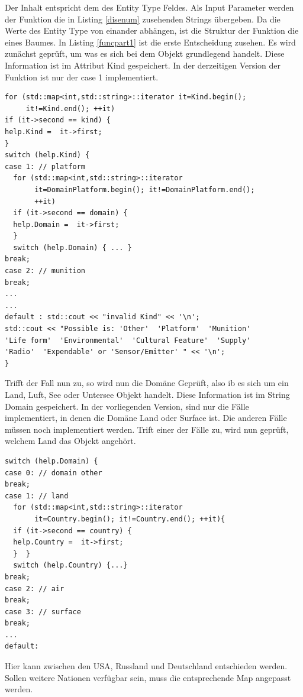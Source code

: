 Der Inhalt entspricht dem  des \glqq Entity Type\grqq{} Feldes. Als Input Parameter werden der Funktion die in Listing  \ref{disenum} zusehenden Strings übergeben. Da die Werte des \glqq Entity Type\grqq{}  von einander abhängen, ist die Struktur der Funktion die eines Baumes.  In Listing \ref{funcpart1} ist die erste Entscheidung zusehen. Es wird zunächst geprüft, um was es sich bei dem Objekt grundlegend handelt. Diese Information ist im Attribut \glqq Kind \grqq{} gespeichert. In der derzeitigen Version der Funktion ist nur der \glqq case 1\grqq{} implementiert. 
 \begin{lstlisting}[caption = Funktion \glqq getDISEntityType()\grqq{} Teil 1  ,label= funcpart1]
for (std::map<int,std::string>::iterator it=Kind.begin(); 
     it!=Kind.end(); ++it)
if (it->second == kind) {
help.Kind =  it->first;
}
switch (help.Kind) {
case 1: // platform
  for (std::map<int,std::string>::iterator 
       it=DomainPlatform.begin(); it!=DomainPlatform.end();
       ++it)
  if (it->second == domain) {
  help.Domain =  it->first;
  }
  switch (help.Domain) { ... }
break;
case 2: // munition
break;
...
...
default : std::cout << "invalid Kind" << '\n';
std::cout << "Possible is: 'Other'  'Platform'  'Munition'
'Life form'  'Environmental'  'Cultural Feature'  'Supply'
'Radio'  'Expendable' or 'Sensor/Emitter' " << '\n';
}
\end{lstlisting}
 Trifft der Fall nun zu, so wird nun die Domäne Geprüft, also ib es sich um ein Land, Luft, See oder Untersee Objekt handelt. Diese Information ist im String \glqq Domain \grqq{} gespeichert. In der vorliegenden Version, sind nur die Fälle implementiert, in denen die Domäne Land oder Surface ist. Die anderen Fälle müssen noch implementiert werden. Trift einer der Fälle zu, wird nun geprüft, welchem Land das Objekt angehört. 
 \begin{lstlisting}[caption = Funktion \glqq getDISEntityType()\grqq{} Teil 2  ,label= funcpart2]
switch (help.Domain) {
case 0: // domain other
break;
case 1: // land
  for (std::map<int,std::string>::iterator 
       it=Country.begin(); it!=Country.end(); ++it){
  if (it->second == country) {
  help.Country =  it->first;
  }  }
  switch (help.Country) {...}
break;
case 2: // air
break;
case 3: // surface
break;
...
default:
 \end{lstlisting}
 Hier kann zwischen den USA, Russland und Deutschland entschieden werden. Sollen weitere Nationen verfügbar sein, muss die entsprechende Map angepasst werden. 
